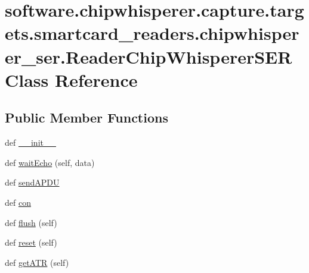\hypertarget{classsoftware_1_1chipwhisperer_1_1capture_1_1targets_1_1smartcard__readers_1_1chipwhisperer__ser_1_1ReaderChipWhispererSER}{}\section{software.\+chipwhisperer.\+capture.\+targets.\+smartcard\+\_\+readers.\+chipwhisperer\+\_\+ser.\+Reader\+Chip\+Whisperer\+S\+E\+R Class Reference}
\label{classsoftware_1_1chipwhisperer_1_1capture_1_1targets_1_1smartcard__readers_1_1chipwhisperer__ser_1_1ReaderChipWhispererSER}
\subsection*{Public Member Functions}
\begin{DoxyCompactItemize}
\item 
def \hyperlink{classsoftware_1_1chipwhisperer_1_1capture_1_1targets_1_1smartcard__readers_1_1chipwhisperer__ser_1_1ReaderChipWhispererSER_a37e9900528182c74474b79a532b9135d}{\+\_\+\+\_\+init\+\_\+\+\_\+}
\item 
def \hyperlink{classsoftware_1_1chipwhisperer_1_1capture_1_1targets_1_1smartcard__readers_1_1chipwhisperer__ser_1_1ReaderChipWhispererSER_aeccccaf9a1c86be8c1cb8b732ad7286f}{wait\+Echo} (self, data)
\item 
def \hyperlink{classsoftware_1_1chipwhisperer_1_1capture_1_1targets_1_1smartcard__readers_1_1chipwhisperer__ser_1_1ReaderChipWhispererSER_acdc60f26527404f2cab0a7df2c6fda64}{send\+A\+P\+D\+U}
\item 
def \hyperlink{classsoftware_1_1chipwhisperer_1_1capture_1_1targets_1_1smartcard__readers_1_1chipwhisperer__ser_1_1ReaderChipWhispererSER_ab08bebdffcacb12c7a426f2575688cd4}{con}
\item 
def \hyperlink{classsoftware_1_1chipwhisperer_1_1capture_1_1targets_1_1smartcard__readers_1_1chipwhisperer__ser_1_1ReaderChipWhispererSER_a1e8dfcbf46f9b735e35c0aa2089a3e11}{flush} (self)
\item 
def \hyperlink{classsoftware_1_1chipwhisperer_1_1capture_1_1targets_1_1smartcard__readers_1_1chipwhisperer__ser_1_1ReaderChipWhispererSER_ac59b531b187c8dc232e933b31099ecb8}{reset} (self)
\item 
def \hyperlink{classsoftware_1_1chipwhisperer_1_1capture_1_1targets_1_1smartcard__readers_1_1chipwhisperer__ser_1_1ReaderChipWhispererSER_a3d64ef6f90ff3987a100897b5e4f9507}{get\+A\+T\+R} (self)
\end{DoxyCompactItemize}
